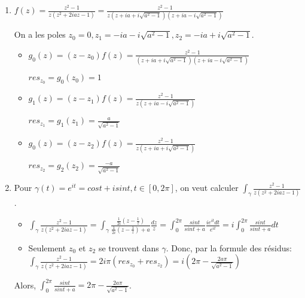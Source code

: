 \documentclass[10pt,a4paper,oneside]{article}
\newenvironment{solution}[1][Solution]{\begin{trivlist}
\item[\hskip \labelsep {\bfseries #1}]}{\end{trivlist}}
\begin{document}
\begin{solution}
\begin{enumerate}
\item
$f(z) = \frac{z^2 - 1}{z(z^2 + 2iaz - 1)} = \frac{z^2 - 1}{z(z + ia + i\sqrt{a^2-1})(z + ia - i\sqrt{a^2-1})}$

On a les poles $z_0 = 0, z_1 = -ia - i\sqrt{a^2 - 1}, z_2 = -ia + i\sqrt{a^2 - 1}$.

\begin{itemize}
\item
$g_0(z) = (z - z_0)f(z) = \frac{z^2 - 1}{(z + ia + i\sqrt{a^2-1})(z + ia - i\sqrt{a^2-1})}$

$res_{z_0} = g_0(z_0) = \boxed{1}$

\item
$g_1(z) = (z - z_1)f(z) = \frac{z^2 - 1}{z(z + ia - i\sqrt{a^2-1})}$

$res_{z_1} = g_1(z_1) = \boxed{\frac{a}{\sqrt{a^2 - 1}}}$

\item
$g_0(z) = (z - z_2)f(z) = \frac{z^2 - 1}{z(z + ia + i\sqrt{a^2-1})}$

$res_{z_2} = g_2(z_2) = \boxed{\frac{-a}{\sqrt{a^2 - 1}}}$
\end{itemize}

\item
Pour $\gamma(t) = e^{it} = cost + isint, t \in [0,2\pi]$, on veut calculer $\int_{\gamma} \frac{z^2 - 1}{z(z^2 + 2iaz - 1)}$.

\begin{itemize}
\item
$\int_{\gamma} \frac{z^2 - 1}{z(z^2 + 2iaz - 1)} = \int_{\gamma} \frac{\frac{1}{2i}(z - \frac{1}{z})}{ \frac{1}{2i}(z - \frac{1}{z}) + a } \frac{dz}{z} = \int_{0}^{2\pi} \frac{sint}{sint + a} \frac{ie^{it}dt}{e^{it}}= i \int_{0}^{2\pi} \frac{sint}{sint + a} dt$

\item
Seulement $z_0$ et $z_2$ se trouvent dans $\gamma$. Donc, par la formule des résidus: $\int_{\gamma} \frac{z^2 - 1}{z(z^2 + 2iaz - 1)} = 2i\pi(res_{z_0} + res_{z_2}) = i (2\pi - \frac{2a\pi}{\sqrt{a^2-1}})$
\end{itemize}

Alors, $\int_{0}^{2\pi} \frac{sint}{sint + a} = \boxed{2\pi - \frac{2a\pi}{\sqrt{a^2-1}}}$.

\end{enumerate}
\end{solution}
\end{document}
